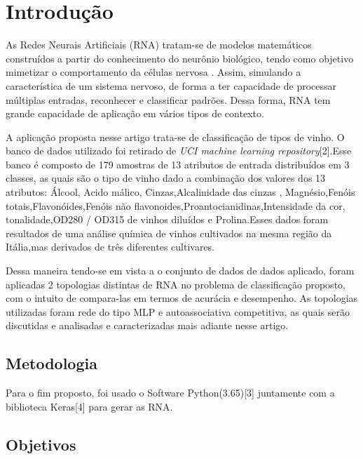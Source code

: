 
\section{Introdução}
As Redes Neurais Artificiais (RNA) tratam-se de modelos matemáticos construídos a partir do conhecimento do neurônio biológico, tendo como objetivo mimetizar o comportamento da células nervosa \cite{ref1} . Assim, simulando a característica de um sistema nervoso, de forma a ter capacidade de processar múltiplas entradas, reconhecer e classificar padrões. Dessa forma, RNA tem grande capacidade de aplicação em vários tipos de contexto.

A aplicação proposta nesse artigo trata-se de classificação de tipos de vinho. O banco de dados utilizado foi retirado de \textit{UCI machine learning repository}[2].Esse banco é composto de 179 amostras de 13 atributos de entrada distribuídos em 3 classes, as quais são o tipo de vinho dado a combinação dos valores dos 13  atributos: Álcool, Acido málico, Cinzas,Alcalinidade das cinzas , Magnésio,Fenóis totais,Flavonóides,Fenóis não flavonoides,Proantocianidinas,Intensidade da cor, tonalidade,OD280 / OD315 de vinhos diluídos e Prolina.Esses dados foram resultados de uma análise química de vinhos cultivados na mesma região da Itália,mas derivados de três diferentes cultivares.

Dessa maneira tendo-se em vista a o conjunto de dados de dados aplicado, foram aplicadas 2 topologias distintas de RNA no problema de classificação proposto, com o intuito de compara-las em termos de acurácia e desempenho. As topologias utilizadas foram rede do tipo MLP e autoassociativa competitiva, as quais serão discutidas e analisadas e caracterizadas mais adiante nesse artigo.


\subsection{Metodologia}

Para o fim proposto, foi usado o Software Python(3.65)[3] juntamente com a biblioteca Keras[4] para gerar as RNA.


\subsection{Objetivos}

